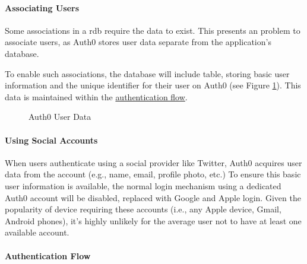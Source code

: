 \paragraph{Associating Users}
Some associations in a \gls{rdb} require the data to exist.
This presents an problem to associate users, as Auth0
stores user data separate from the application's database.

To enable such associations, the database will include
 table, storing basic user information and the
unique identifier for their user on Auth0 (see Figure
\ref{fig:auth0Data}).
This data is maintained within the
\hyperref[p:authFlow]{authentication flow}.

\begin{figure}
  
  \caption{Auth0 User Data}
  \label{fig:auth0Data}
\end{figure}

\paragraph{Using Social Accounts}
When users authenticate using a social provider like
Twitter, Auth0 acquires user data from the account (e.g.,
name, email, profile photo, etc.)
To ensure this basic user information is available, the
normal login mechanism using a dedicated Auth0 account will
be disabled, replaced with Google and Apple login.
Given the popularity of device requiring these accounts
(i.e., any Apple device, Gmail, Android phones), it's
highly unlikely for the average user not to have at least
one available account.

\paragraph{Authentication Flow}
\label{p:authFlow}

